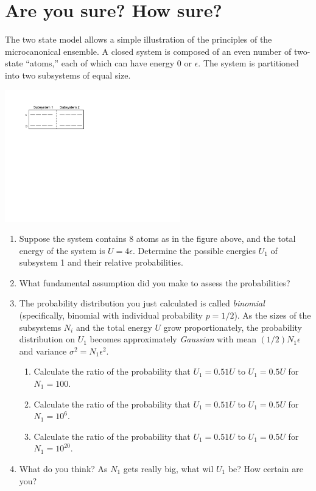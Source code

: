 \documentclass[11pt]{article}
\begin{document}
\section{Are you sure? How sure?}
\label{sec:org3714880}
The two state model allows a simple illustration
  of the principles of the microcanonical ensemble. A closed system is composed of an even
  number of two-state ``atoms,'' each of which can have energy 0 or \(\epsilon\).  The
  system is partitioned into two subsystems of equal size.

\begin{center}
\includegraphics[width=3in]{./figs/Two-state.pdf}
\end{center}

\begin{enumerate}
\item Suppose the system contains 8 atoms as in the figure above, and the total energy of
the system is \(U = 4\epsilon\).  Determine the possible energies \(U_1\) of subsystem 1 and
their relative probabilities.
\item What fundamental assumption did you make to assess the probabilities?

\item The probability distribution you just calculated is called \emph{binomial}
(specifically, binomial with individual probability \(p=1/2\)).  As the sizes of
the subsystems \(N_i\) and the total energy \(U\) grow proportionately, the
probability distribution on \(U_1\) becomes approximately \emph{Gaussian} with mean
\((1/2) N_1\epsilon\) and variance \(\sigma^2 = N_1\epsilon^2\).

\begin{enumerate}
\item Calculate the ratio of the probability that \(U_1=0.51 U\) to \(U_1=0.5 U\) for \(N_1 = 100\).
\item Calculate the ratio of the probability that \(U_1=0.51 U\) to \(U_1=0.5 U\) for \(N_1 = 10^6\).
\item Calculate the ratio of the probability that \(U_1=0.51 U\) to \(U_1=0.5 U\) for \(N_1 = 10^{20}\).
\end{enumerate}

\item What do you think? As \(N_1\) gets really big, what wil \(U_1\) be?  How certain are you?
\end{enumerate}
\end{document}
